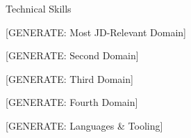 \documentclass{resume}
\begin{document}
\begin{rSection}{Technical Skills}

\begin{skillgroup}{[GENERATE: Most JD-Relevant Domain]}
\skilldash{[GENERATE]}
\skilldash{[GENERATE]}
\end{skillgroup}

\begin{skillgroup}{[GENERATE: Second Domain]}
\skilldash{[GENERATE]}
\skilldash{[GENERATE]}
\end{skillgroup}

\begin{skillgroup}{[GENERATE: Third Domain]}
\skilldash{[GENERATE]}
\end{skillgroup}

\begin{skillgroup}{[GENERATE: Fourth Domain]}
\skilldash{[GENERATE]}
\end{skillgroup}

\begin{skillgroup}{[GENERATE: Languages \& Tooling]}
\skilldash{[GENERATE]}
\end{skillgroup}

\end{rSection}
\vspace{-0.15cm}
\end{document}
